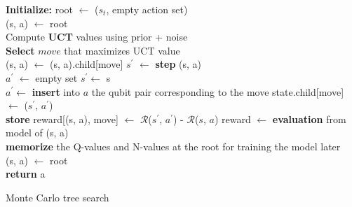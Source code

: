 \documentclass[%
 reprint,
amsmath,amssymb,showkeys,
pra,
]{revtex4-2}
\begin{document}
\begin{algorithm}[t]
	\SetAlgoLined
	\DontPrintSemicolon
	\textbf{Initialize:} root $\leftarrow$ ($s_t$, empty action set) \\
	 {
	(s, a) $\gets$ root\\
	 {
		Compute \textbf{UCT} values using prior + noise \\
	    \textbf{Select} $move$ that maximizes UCT value \\
    	 {
    	    (s, a) $\gets$ (s, a).child[move]
    	} {
    		 {
    			$s^\prime$ $\gets$ \textbf{step} (s, a) \\
                $a^\prime$ $\leftarrow$ empty set
            } {
                $s^\prime \gets$ s \\
    		    $a^\prime \gets$ \textbf{insert} into $a$ the qubit pair corresponding to the move
    		}
    	    state.child[move] $\gets$ ($s^\prime$, $a^\prime$) \\
    	    \textbf{store} reward[(s, a), move] $\gets$ $\mathcal{R}$($s^\prime$, $a^\prime$) - $\mathcal{R}$($s$, $a$) 
    	}%
	}%
	    reward $\gets$ \textbf{evaluation} from model of (s, a) \\
    }%
	\textbf{memorize} the Q-values and N-values at the root for training the model later \\
    (s, a)  $\gets$ root \\
    \textbf{return} a

    \caption{Monte Carlo tree search}
\label{algo:mcts}
\end{algorithm}
\end{document}
